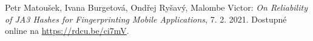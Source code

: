 \documentclass[12pt,a4paper]{article}
\begin{document}

\newpage


\newpage


\newpage


\newpage


\newpage


\begin{thebibliography}{1}

     Petr Matoušek, Ivana Burgetová, Ondřej Ryšavý, Malombe Victor: \textit{On Reliability of JA3 Hashes for Fingerprinting Mobile Applications}, 7. 2. 2021. Dostupné online na \url{https://rdcu.be/ci7mV}.

\end{thebibliography}

\end{document}
